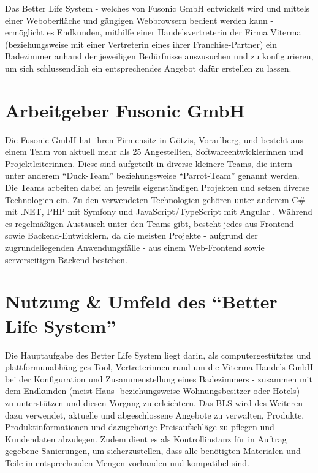 \documentclass[a4paper,12pt,twoside]{scrreprt}
\begin{document}
Das Better Life System - welches von Fusonic GmbH entwickelt wird und mittels einer Weboberfläche und gängigen Webbrowsern bedient werden kann - ermöglicht es Endkunden, mithilfe einer Handelsvertreterin der Firma Viterma (beziehungsweise mit einer Vertreterin eines ihrer Franchise-Partner) ein Badezimmer anhand der jeweiligen Bedürfnisse auszusuchen und zu konfigurieren, um sich schlussendlich ein entsprechendes Angebot dafür erstellen zu lassen.

\section{Arbeitgeber Fusonic GmbH}
\label{sec:arbeitgeber}
Die Fusonic GmbH hat ihren Firmensitz in Götzis, Vorarlberg, und besteht aus einem Team von aktuell mehr als 25 Angestellten, Softwareentwicklerinnen und Projektleiterinnen. Diese sind aufgeteilt in diverse kleinere Teams, die intern unter anderem \enquote{Duck-Team} beziehungsweise \enquote{Parrot-Team} genannt werden. Die Teams arbeiten dabei an jeweils eigenständigen Projekten und setzen diverse Technologien ein. Zu den verwendeten Technologien gehören unter anderem C\# mit .NET, PHP mit Symfony und JavaScript/TypeScript mit Angular \parencite[]["Übersicht aller Technologien"]{fusonic_gmbh_web_2020}. Während es regelmäßigen Austausch unter den Teams gibt, besteht jedes aus Frontend- sowie Backend-Entwicklern, da die meisten Projekte - aufgrund der zugrundeliegenden Anwendungsfälle - aus einem Web-Frontend sowie serverseitigen Backend bestehen.

\section{Nutzung \& Umfeld des \enquote{Better Life System}}
\label{sec:nutzung-umfeld}
Die Hauptaufgabe des Better Life System liegt darin, als computergestütztes und plattformunabhängiges Tool, Vertreterinnen rund um die Viterma Handels GmbH bei der Konfiguration und Zusammenstellung eines Badezimmers - zusammen mit dem Endkunden (meist Haus- beziehungsweise Wohnungsbesitzer oder Hotels) - zu unterstützen und diesen Vorgang zu erleichtern. Das BLS wird des Weiteren dazu verwendet, aktuelle und abgeschlossene Angebote zu verwalten, Produkte, Produktinformationen und dazugehörige Preisaufschläge zu pflegen und Kundendaten abzulegen. Zudem dient es als Kontrollinstanz für in Auftrag gegebene Sanierungen, um sicherzustellen, dass alle benötigten Materialen und Teile in entsprechenden Mengen vorhanden und kompatibel sind.
\end{document}
